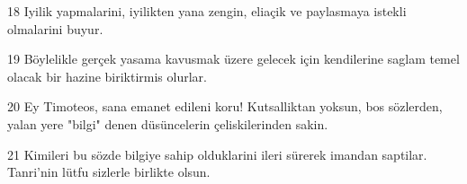 \par 18 Iyilik yapmalarini, iyilikten yana zengin, eliaçik ve paylasmaya istekli olmalarini buyur.
\par 19 Böylelikle gerçek yasama kavusmak üzere gelecek için kendilerine saglam temel olacak bir hazine biriktirmis olurlar.
\par 20 Ey Timoteos, sana emanet edileni koru! Kutsalliktan yoksun, bos sözlerden, yalan yere "bilgi" denen düsüncelerin çeliskilerinden sakin.
\par 21 Kimileri bu sözde bilgiye sahip olduklarini ileri sürerek imandan saptilar. Tanri'nin lütfu sizlerle birlikte olsun.


